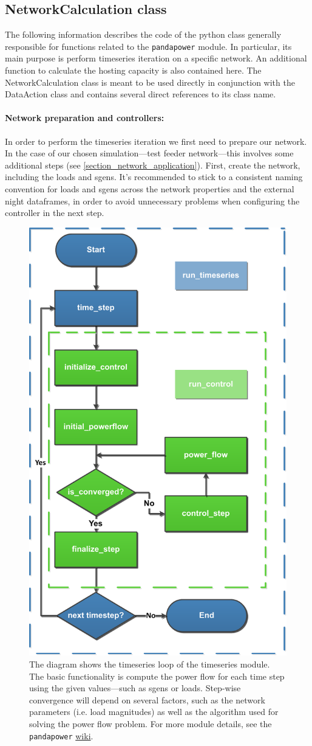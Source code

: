 \documentclass[a4paper,10pt]{report}
\begin{document}
\subsection{NetworkCalculation class}
The following information describes the code of the python class generally responsible for functions related to the \texttt{pandapower} module. In particular, its main purpose is perform timeseries iteration on a specific network. An additional function to calculate the hosting capacity is also contained here. The NetworkCalculation class is meant to be used directly in conjunction with the DataAction class and contains several direct references to its class name.

\paragraph{Network preparation and controllers:} In order to perform the timeseries iteration we first need to prepare our network. In the case of our chosen simulation---test feeder network---this involves some additional steps (see \cref{section_network_application}). First, create the network, including the loads and sgens. It's recommended to stick to a consistent naming convention for loads and sgens across the network properties and the external night dataframes, in order to avoid unnecessary problems when configuring the controller in the next step.

\FloatBarrier
\begin{figure}[htpb]
	\centering
	\includegraphics[width=0.32\linewidth]{timeseries_module_diag.pdf}
	\caption[\texttt{pandapower} times series module overview]{The diagram shows the timeseries loop of the timeseries module. The basic functionality is compute the power flow for each time step using the given values---such as sgens or loads. Step-wise convergence will depend on several factors, such as the network parameters (i.e. load magnitudes) as well as the algorithm used for solving the power flow problem. For more module details, see the \texttt{pandapower}  \href{https://pandapower.readthedocs.io/en/v2.10.1/timeseries/timeseries_loop.html}{wiki}.}
	\label{timeseries_module_diag}
\end{figure}
\FloatBarrier
\end{document}
